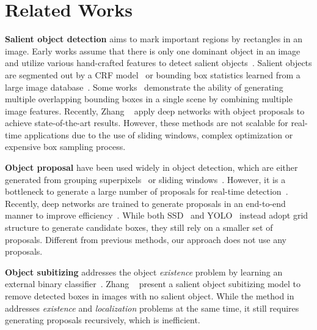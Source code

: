\documentclass[10pt,twocolumn,letterpaper]{article}
\begin{document}
\section{Related Works}
{\textbf{Salient object detection} aims to mark important regions by rectangles in an image. Early works assume that there is only one dominant object in an image and utilize various hand-crafted features to detect salient objects~\cite{liu2011learning,DBLP:conf/cvpr/WangWZFZL12}. Salient objects are segmented out by a CRF model~\cite{liu2011learning} or bounding box statistics learned from a large image database~\cite{DBLP:conf/cvpr/WangWZFZL12}. Some works~\cite{feng2011salient,siva2013looking} demonstrate the ability of generating multiple overlapping bounding boxes in a single scene by combining multiple image features. Recently, Zhang \etal~\cite{zhang2015SOD} apply deep networks with object proposals to achieve state-of-the-art results. However, these methods are not scalable for real-time applications due to the use of sliding windows, complex optimization or expensive box sampling process.}


\textbf{Object proposal} have been used widely in object detection, which are either generated from grouping superpixels~\cite{DBLP:conf/cvpr/ArbelaezPBMM14,DBLP:journals/pami/CarreiraS12,DBLP:journals/ijcv/UijlingsSGS13} or sliding windows~\cite{DBLP:journals/pami/AlexeDF12,DBLP:conf/eccv/ZitnickD14}. However, it is a bottleneck to generate a large number of proposals for real-time detection~\cite{DBLP:conf/iccv/Girshick15,DBLP:conf/cvpr/GirshickDDM14}. Recently, deep networks are trained to generate proposals in an end-to-end manner to improve efficiency~\cite{DBLP:conf/cvpr/ErhanSTA14,DBLP:conf/nips/RenHGS15}.
While both SSD~\cite{DBLP:conf/eccv/LiuAESRFB16} and YOLO~\cite{DBLP:journals/corr/RedmonDGF15} instead adopt grid structure to generate candidate boxes, they still rely on a smaller set of proposals. Different from previous methods, our approach does not use any proposals.


\textbf{Object subitizing} addresses the object \emph{existence} problem by learning an external binary classifier~\cite{DBLP:conf/crv/ScharfenbergerWZC13,DBLP:conf/cvpr/WangWZFZL12}. Zhang \etal~\cite{DBLP:conf/cvpr/ZhangMSSBLSPM15} present a salient object subitizing model to remove detected boxes in images with no salient object. While the method in~\cite{zhang2015SOD} addresses \emph{existence} and \emph{localization} problems at the same time, it still requires generating proposals recursively, which is inefficient.
\end{document}
